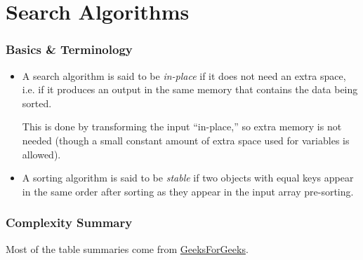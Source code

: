 \documentclass[12pt]{article}
\begin{document}
	\part*{Search Algorithms}
	
	\section*{Basics \& Terminology}
	
	\begin{itemize}
		\item A search algorithm is said to be \emph{in-place} if it does not need an extra space, i.e. if it produces an output in the same memory that contains the data being sorted.
		
		This is done by transforming the input ``in-place,'' so extra memory is not needed (though a small constant amount of extra space used for variables is allowed).
		
		\item A sorting algorithm is said to be \emph{stable} if two objects with equal keys appear in the same order after sorting as they appear in the input array pre-sorting.
	\end{itemize}
	
	\section*{Complexity Summary}
	
	Most of the table summaries come from \href{https://www.geeksforgeeks.org/time-complexities-of-all-sorting-algorithms/}{GeeksForGeeks}.
	
\end{document}
